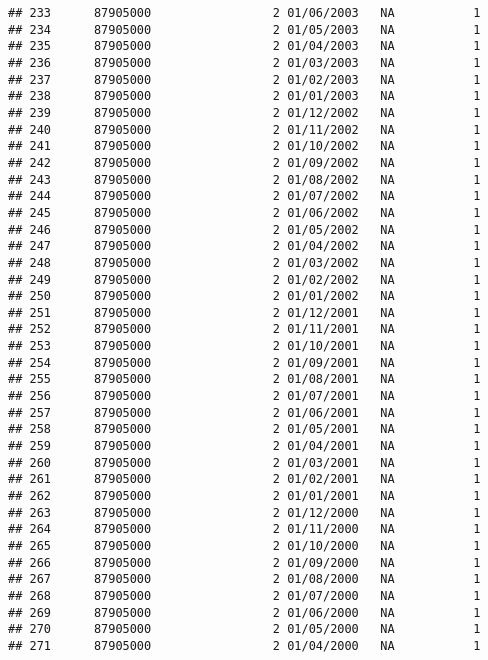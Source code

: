 \documentclass[
]{article}
\begin{document}
\begin{verbatim}
## 233      87905000                 2 01/06/2003   NA           1
## 234      87905000                 2 01/05/2003   NA           1
## 235      87905000                 2 01/04/2003   NA           1
## 236      87905000                 2 01/03/2003   NA           1
## 237      87905000                 2 01/02/2003   NA           1
## 238      87905000                 2 01/01/2003   NA           1
## 239      87905000                 2 01/12/2002   NA           1
## 240      87905000                 2 01/11/2002   NA           1
## 241      87905000                 2 01/10/2002   NA           1
## 242      87905000                 2 01/09/2002   NA           1
## 243      87905000                 2 01/08/2002   NA           1
## 244      87905000                 2 01/07/2002   NA           1
## 245      87905000                 2 01/06/2002   NA           1
## 246      87905000                 2 01/05/2002   NA           1
## 247      87905000                 2 01/04/2002   NA           1
## 248      87905000                 2 01/03/2002   NA           1
## 249      87905000                 2 01/02/2002   NA           1
## 250      87905000                 2 01/01/2002   NA           1
## 251      87905000                 2 01/12/2001   NA           1
## 252      87905000                 2 01/11/2001   NA           1
## 253      87905000                 2 01/10/2001   NA           1
## 254      87905000                 2 01/09/2001   NA           1
## 255      87905000                 2 01/08/2001   NA           1
## 256      87905000                 2 01/07/2001   NA           1
## 257      87905000                 2 01/06/2001   NA           1
## 258      87905000                 2 01/05/2001   NA           1
## 259      87905000                 2 01/04/2001   NA           1
## 260      87905000                 2 01/03/2001   NA           1
## 261      87905000                 2 01/02/2001   NA           1
## 262      87905000                 2 01/01/2001   NA           1
## 263      87905000                 2 01/12/2000   NA           1
## 264      87905000                 2 01/11/2000   NA           1
## 265      87905000                 2 01/10/2000   NA           1
## 266      87905000                 2 01/09/2000   NA           1
## 267      87905000                 2 01/08/2000   NA           1
## 268      87905000                 2 01/07/2000   NA           1
## 269      87905000                 2 01/06/2000   NA           1
## 270      87905000                 2 01/05/2000   NA           1
## 271      87905000                 2 01/04/2000   NA           1

\end{verbatim}
\end{document}
